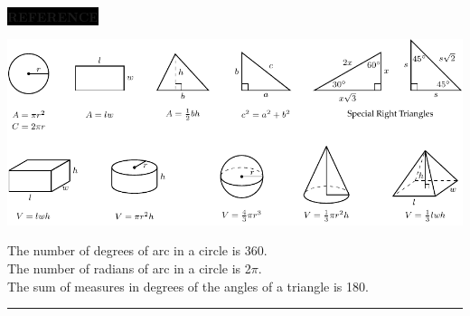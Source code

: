 \documentclass[10pt,twoside]{article}
\begin{document}
\vspace*{0mm}



\hspace*{32mm}
\parbox{15cm}{%
\raggedright
\colorbox{black}{\color{white}\textbf{\small REFERENCE}}\hskip-2pt

\vspace*{4mm}

\includegraphics{sat_2016_math_formula_key.pdf}

\vspace*{2mm}

The number of degrees of arc in a circle is 360.\\[1ex]

The number of radians of arc in a circle is 2$\pi$.\\[1ex]

The sum of measures in degrees of the angles of a triangle is 180.}

\vspace*{4mm}

\hrule height 1pt
\end{document}
